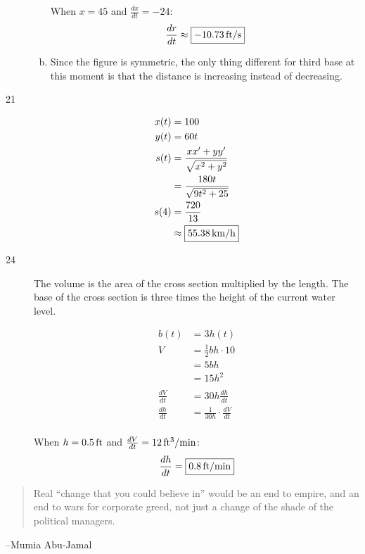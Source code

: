 \documentclass[letterpaper, landscape]{exam}
\begin{document}
\begin{description}
\begin{enumerate}[(a)]
          When $x = 45$ and $\frac{dx}{dt} = -24$:
          \[
            \frac{dr}{dt} \approx \boxed{ \unit[-10.73]{ft/s} }
          \]

        \item Since the figure is symmetric, the only thing different for third base at this moment
          is that the distance is increasing instead of decreasing.

      \end{enumerate}

    \item[21]
      \begin{align*}
        x(t) & = 100 \\
        y(t) & = 60t \\
        s(t) & = \frac{xx' + yy'}{\sqrt{x^2 + y^2}} \\
             & = \frac{180t}{\sqrt{9t^2 + 25}}
        \\
        s(4) & = \frac{720}{13} \\
             & \approx \boxed{ \unit[55.38]{km/h} } \\
      \end{align*}

    \item[24]
      The volume is the area of the cross section multiplied by the length. The base of the cross
      section is three times the height of the current water level.

      \begin{align*}
        b(t) & = 3 h(t) \\
        V    & = \frac{1}{2} bh \cdot 10 \\
             & = 5bh \\
             & = 15 h^2 \\
        \\
        \frac{dV}{dt} &= 30 h \frac{dh}{dt} \\
        \frac{dh}{dt} &= \frac{1}{30 h} \cdot \frac{dV}{dt} \\
      \end{align*}

      When $h = \unit[0.5]{ft}$ and $\frac{dV}{dt} = \unit[12]{ft^3/min}$:
      \[
        \frac{dh}{dt} = \boxed{ \unit[0.8]{ft/min} }
      \]

  \end{description}

  \else
    \vspace{10 cm}
    \begin{quote}
      \begin{em}
        Real ``change that you could believe in'' would be an end to empire,
        and an end to wars for corporate greed, not just a change of the shade
        of the political managers.
      \end{em}
    \end{quote}
    \hspace{2 cm} --Mumia Abu-Jamal
  \fi
\end{document}
